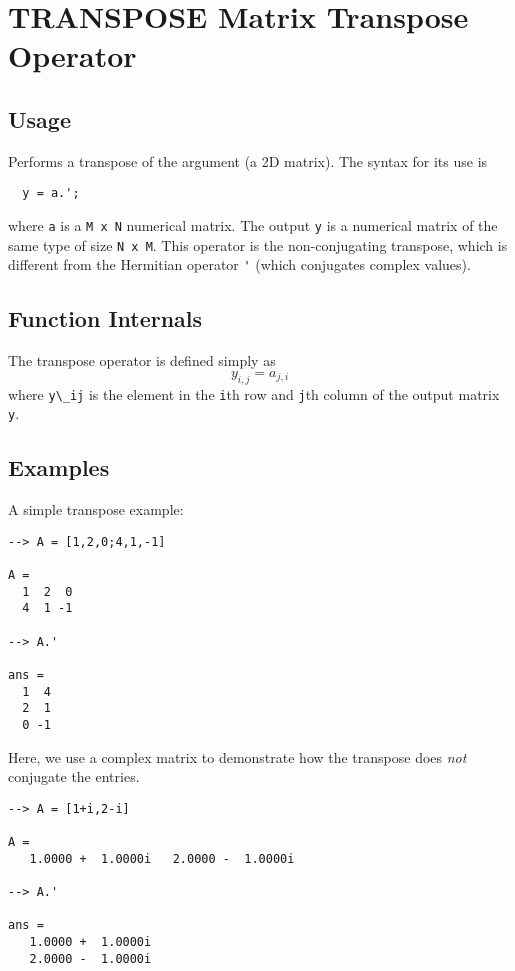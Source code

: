 \section{TRANSPOSE Matrix Transpose Operator}

\subsection{Usage}

Performs a transpose of the argument (a 2D matrix).  The syntax for its use is
\begin{verbatim}
  y = a.';
\end{verbatim}
where \verb|a| is a \verb|M x N| numerical matrix.  The output \verb|y| is a numerical matrix
of the same type of size \verb|N x M|.  This operator is the non-conjugating transpose,
which is different from the Hermitian operator \verb|'| (which conjugates complex values).
\subsection{Function Internals}

The transpose operator is defined simply as
\[
  y_{i,j} = a_{j,i}
\]
where \verb|y\_ij| is the element in the \verb|i|th row and \verb|j|th column of the output matrix \verb|y|.
\subsection{Examples}

A simple transpose example:
\begin{verbatim}
--> A = [1,2,0;4,1,-1]

A = 
  1  2  0 
  4  1 -1 

--> A.'

ans = 
  1  4 
  2  1 
  0 -1 
\end{verbatim}
Here, we use a complex matrix to demonstrate how the transpose does \emph{not} conjugate the entries.
\begin{verbatim}
--> A = [1+i,2-i]

A = 
   1.0000 +  1.0000i   2.0000 -  1.0000i 

--> A.'

ans = 
   1.0000 +  1.0000i 
   2.0000 -  1.0000i 
\end{verbatim}
